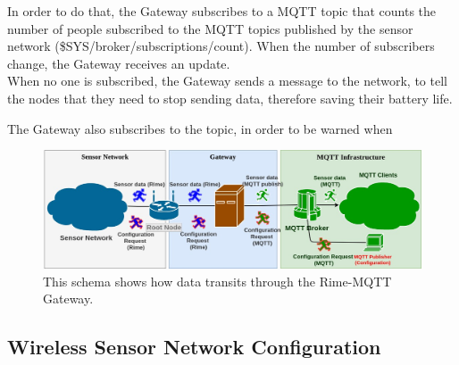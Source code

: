 \documentclass[a4paper,11pt]{article}
\begin{document}
In order to do that, the Gateway subscribes to a MQTT topic that counts the number of people subscribed to the MQTT topics published by the sensor network (\$SYS/broker/subscriptions/count). When the number of subscribers change, the Gateway receives an update.\\

When no one is subscribed, the Gateway sends a message to the network, to tell the nodes that they need to stop sending data, therefore saving their battery life.

The Gateway also subscribes to the  topic, in order to be warned when 

\begin{figure}
  \includegraphics[width=\linewidth]{img/communication-2.jpg}
  \caption{This schema shows how data transits through the Rime-MQTT Gateway.}
  \label{fig:communication1}
\end{figure}

\subsection{Wireless Sensor Network Configuration}
\end{document}

